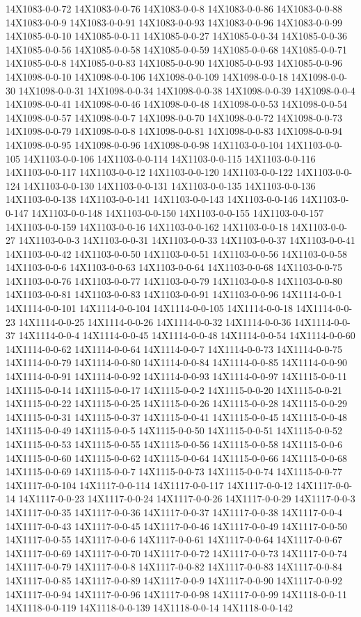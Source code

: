 \documentclass[
]{book}
\begin{document}
14X1083-0-0-72 14X1083-0-0-76 14X1083-0-0-8 14X1083-0-0-86 14X1083-0-0-88 14X1083-0-0-9 14X1083-0-0-91 14X1083-0-0-93 14X1083-0-0-96 14X1083-0-0-99 14X1085-0-0-10 14X1085-0-0-11 14X1085-0-0-27 14X1085-0-0-34 14X1085-0-0-36 14X1085-0-0-56 14X1085-0-0-58 14X1085-0-0-59 14X1085-0-0-68 14X1085-0-0-71 14X1085-0-0-8 14X1085-0-0-83 14X1085-0-0-90 14X1085-0-0-93 14X1085-0-0-96 14X1098-0-0-10 14X1098-0-0-106 14X1098-0-0-109 14X1098-0-0-18 14X1098-0-0-30 14X1098-0-0-31 14X1098-0-0-34 14X1098-0-0-38 14X1098-0-0-39 14X1098-0-0-4 14X1098-0-0-41 14X1098-0-0-46 14X1098-0-0-48 14X1098-0-0-53 14X1098-0-0-54 14X1098-0-0-57 14X1098-0-0-7 14X1098-0-0-70 14X1098-0-0-72 14X1098-0-0-73 14X1098-0-0-79 14X1098-0-0-8 14X1098-0-0-81 14X1098-0-0-83 14X1098-0-0-94 14X1098-0-0-95 14X1098-0-0-96 14X1098-0-0-98 14X1103-0-0-104 14X1103-0-0-105 14X1103-0-0-106 14X1103-0-0-114 14X1103-0-0-115 14X1103-0-0-116 14X1103-0-0-117 14X1103-0-0-12 14X1103-0-0-120 14X1103-0-0-122 14X1103-0-0-124 14X1103-0-0-130 14X1103-0-0-131 14X1103-0-0-135 14X1103-0-0-136 14X1103-0-0-138 14X1103-0-0-141 14X1103-0-0-143 14X1103-0-0-146 14X1103-0-0-147 14X1103-0-0-148 14X1103-0-0-150 14X1103-0-0-155 14X1103-0-0-157 14X1103-0-0-159 14X1103-0-0-16 14X1103-0-0-162 14X1103-0-0-18 14X1103-0-0-27 14X1103-0-0-3 14X1103-0-0-31 14X1103-0-0-33 14X1103-0-0-37 14X1103-0-0-41 14X1103-0-0-42 14X1103-0-0-50 14X1103-0-0-51 14X1103-0-0-56 14X1103-0-0-58 14X1103-0-0-6 14X1103-0-0-63 14X1103-0-0-64 14X1103-0-0-68 14X1103-0-0-75 14X1103-0-0-76 14X1103-0-0-77 14X1103-0-0-79 14X1103-0-0-8 14X1103-0-0-80 14X1103-0-0-81 14X1103-0-0-83 14X1103-0-0-91 14X1103-0-0-96 14X1114-0-0-1 14X1114-0-0-101 14X1114-0-0-104 14X1114-0-0-105 14X1114-0-0-18 14X1114-0-0-23 14X1114-0-0-25 14X1114-0-0-26 14X1114-0-0-32 14X1114-0-0-36 14X1114-0-0-37 14X1114-0-0-4 14X1114-0-0-45 14X1114-0-0-48 14X1114-0-0-54 14X1114-0-0-60 14X1114-0-0-62 14X1114-0-0-64 14X1114-0-0-7 14X1114-0-0-73 14X1114-0-0-75 14X1114-0-0-79 14X1114-0-0-80 14X1114-0-0-84 14X1114-0-0-85 14X1114-0-0-90 14X1114-0-0-91 14X1114-0-0-92 14X1114-0-0-93 14X1114-0-0-97 14X1115-0-0-11 14X1115-0-0-14 14X1115-0-0-17 14X1115-0-0-2 14X1115-0-0-20 14X1115-0-0-21 14X1115-0-0-22 14X1115-0-0-25 14X1115-0-0-26 14X1115-0-0-28 14X1115-0-0-29 14X1115-0-0-31 14X1115-0-0-37 14X1115-0-0-41 14X1115-0-0-45 14X1115-0-0-48 14X1115-0-0-49 14X1115-0-0-5 14X1115-0-0-50 14X1115-0-0-51 14X1115-0-0-52 14X1115-0-0-53 14X1115-0-0-55 14X1115-0-0-56 14X1115-0-0-58 14X1115-0-0-6 14X1115-0-0-60 14X1115-0-0-62 14X1115-0-0-64 14X1115-0-0-66 14X1115-0-0-68 14X1115-0-0-69 14X1115-0-0-7 14X1115-0-0-73 14X1115-0-0-74 14X1115-0-0-77 14X1117-0-0-104 14X1117-0-0-114 14X1117-0-0-117 14X1117-0-0-12 14X1117-0-0-14 14X1117-0-0-23 14X1117-0-0-24 14X1117-0-0-26 14X1117-0-0-29 14X1117-0-0-3 14X1117-0-0-35 14X1117-0-0-36 14X1117-0-0-37 14X1117-0-0-38 14X1117-0-0-4 14X1117-0-0-43 14X1117-0-0-45 14X1117-0-0-46 14X1117-0-0-49 14X1117-0-0-50 14X1117-0-0-55 14X1117-0-0-6 14X1117-0-0-61 14X1117-0-0-64 14X1117-0-0-67 14X1117-0-0-69 14X1117-0-0-70 14X1117-0-0-72 14X1117-0-0-73 14X1117-0-0-74 14X1117-0-0-79 14X1117-0-0-8 14X1117-0-0-82 14X1117-0-0-83 14X1117-0-0-84 14X1117-0-0-85 14X1117-0-0-89 14X1117-0-0-9 14X1117-0-0-90 14X1117-0-0-92 14X1117-0-0-94 14X1117-0-0-96 14X1117-0-0-98 14X1117-0-0-99 14X1118-0-0-11 14X1118-0-0-119 14X1118-0-0-139 14X1118-0-0-14 14X1118-0-0-142 
\end{document}
